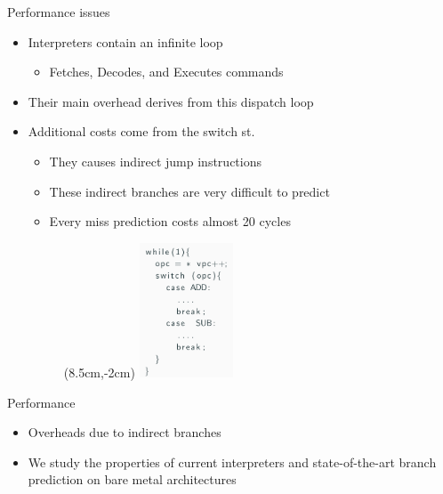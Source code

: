 \documentclass[10pt]{beamer}
\begin{document}
\begin{frame}{Performance issues}
	\begin{itemize}
		\item {Interpreters contain an infinite loop}
			\begin{itemize}
			\item {Fetches, Decodes, and Executes commands}
			\end{itemize}
		\item {Their main overhead derives from this dispatch loop}
		\item {Additional costs come from the switch st.}
				\begin{itemize}
					\item {They causes indirect jump instructions}
					\item {These indirect branches are very difficult to predict}
					\item {Every miss prediction costs almost 20 cycles}
				\end{itemize}
				    \begin{figure}
				    	\begin{textblock*}{3cm}(8.5cm,-2cm)
				    		\includegraphics[height=4cm]{figures/dispatchloop.png}
				    	\end{textblock*}
				    	
				    \end{figure}	
	\end{itemize}

\end{frame}

\begin{frame}{Performance }
    \begin{itemize}
        \item{Overheads due to indirect branches}

        \item{We study the properties of current interpreters and
            state-of-the-art branch prediction on bare metal
            architectures}
    \end{itemize}
\end{frame}
%
\end{document}
